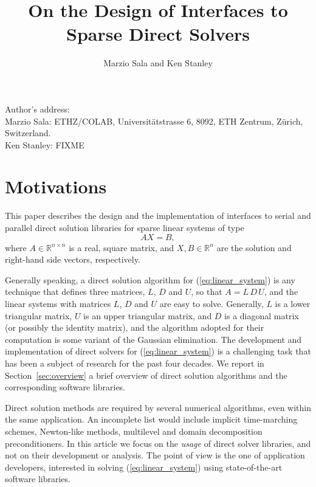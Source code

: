 \documentclass[acmtocl]{acmtrans2m}
\title{On the Design of Interfaces to Sparse Direct Solvers}
\author{Marzio Sala and Ken Stanley}
\begin{document}
\setcounter{page}{1}

\begin{bottomstuff}
Author's address:   \\
Marzio Sala: ETHZ/COLAB, Universit\"atstrasse 6, 8092, ETH Zentrum, Z\"urich,
  Switzerland. \\
Ken Stanley: FIXME
\end{bottomstuff}

\maketitle

\section{Motivations}
\label{sec:introduction}

This paper describes the design and the implementation of 
interfaces to serial and parallel direct solution libraries for
sparse linear systems of type
\begin{equation}
  \label{eq:linear_system}
  A X = B,
\end{equation}
where $A \in \mathbb{R}^{n \times n}$ is a real, square matrix, 
  and $X, B \in \mathbb{R}^{n}$ are the solution and
right-hand side vectors, respectively. 

Generally speaking,
a direct solution algorithm for (\ref{eq:linear_system}) is any 
technique that defines three matrices, $L$, $D$ and $U$, so that
$A = L \, D \, U$, and the linear systems with matrices $L$, $D$ and $U$ are
easy to solve. Generally, $L$ is a lower triangular matrix, $U$ is an
upper triangular matrix, and $D$ is a diagonal matrix 
(or possibly the identity matrix), and the algorithm adopted for their
computation is some variant of the Gaussian elimination. 
The development and implementation of
direct solvers for (\ref{eq:linear_system}) is a
challenging task that has been a subject of research for the
past four decades. 
We report in
Section~\ref{sec:overview} a brief overview of direct solution algorithms and
the corresponding software libraries.

\smallskip

Direct solution methods are required by several numerical algorithms, even
within the same application. An
incomplete list would include implicit time-marching schemes, 
Newton-like methods, multilevel and domain decomposition preconditioners. In
this article we focus on the {\sl usage} of direct solver libraries, and not
on their development or analysis. The point of view is the one
of application developers, interested in solving
(\ref{eq:linear_system}) using state-of-the-art software libraries.  
\end{document}
